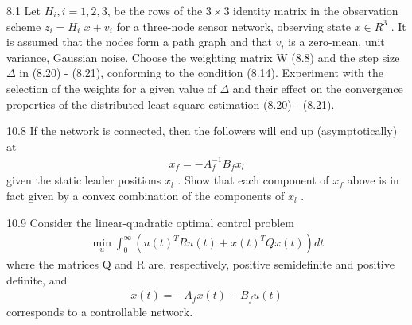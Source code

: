 \documentclass{article}
\begin{document}
\begin{problem} 8.1
    Let $H_i , i = 1, 2, 3$, be the rows of the $3 \times 3$ identity matrix in the observation scheme $z_i = H_i$ $x + v_i$ for a three-node sensor network, observing state $x \in R^3$ . It is assumed that the nodes form a path graph and that $v_i$ is a zero-mean, unit variance, Gaussian noise. Choose the weighting matrix W (8.8) and the step size $\Delta$ in (8.20) - (8.21), conforming to the condition (8.14). Experiment with the selection of the weights for a given value of $\Delta$ and their effect on the convergence properties of the distributed least square estimation (8.20) - (8.21).
\end{problem}
\begin{problem} 10.8
    If the network is connected, then the followers will end up (asymptotically) at
    \begin{align*}
        x_f = -A_f^{-1} B_f x_l
    \end{align*}
    given the static leader positions $x_l$ . Show that each component of $x_f$ above is in fact given by a convex combination of the components of $x_l$ .
\end{problem}
\begin{problem} 10.9
    Consider the linear-quadratic optimal control problem
    \begin{align*}
        \min_{u} \int_{0}^{\infty} (u(t)^T R u(t) + x(t)^T Q x(t))dt
    \end{align*}
    where the matrices Q and R are, respectively, positive semideﬁnite and positive definite, and 
    \begin{align*}
        \dot x(t) = -A_f x(t) - B_f u(t) 
    \end{align*}
    corresponds to a controllable network.
\end{problem}
\end{document}
